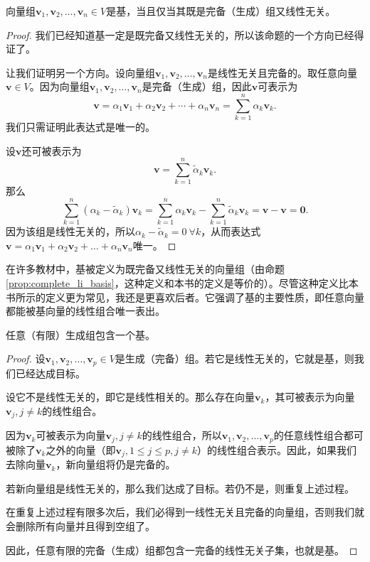 \begin{proposition}\label{prop:complete_li_basis}
    向量组$\mathbf{v}_{1},\mathbf{v}_{2},\ldots,\mathbf{v}_{n}\in V$是基，当且仅当其既是完备（生成）组又线性无关。
\end{proposition}

\begin{proof}
    我们已经知道基一定是既完备又线性无关的，所以该命题的一个方向已经得证了。

    让我们证明另一个方向。设向量组$\mathbf{v}_{1},\mathbf{v}_{2},\ldots,\mathbf{v}_{n}$是线性无关且完备的。取任意向量$\mathbf{v}\in V$。因为向量组$\mathbf{v}_{1},\mathbf{v}_{2},\ldots,\mathbf{v}_{n}$是完备（生成）组，因此$\mathbf{v}$可表示为\[\mathbf{v}=\alpha_1\mathbf{v}_1+\alpha_2\mathbf{v}_2+\cdots+\alpha_n\mathbf{v}_n=\sum_{k=1}^n\alpha_k\mathbf{v}_k.\]
    我们只需证明此表达式是唯一的。

    设$\mathbf{v}$还可被表示为\[\mathbf{v}=\sum_{k=1}^{n}\widetilde{\alpha}_{k}\mathbf{v}_{k}.\]
    那么\[\sum_{k=1}^n(\alpha_k-\widetilde{\alpha}_k)\mathbf{v}_k=\sum_{k=1}^n\alpha_k\mathbf{v}_k-\sum_{k=1}^n\widetilde{\alpha}_k\mathbf{v}_k=\mathbf{v}-\mathbf{v}=\mathbf{0}.\]
    因为该组是线性无关的，所以$\alpha_k-\widetilde{\alpha}_k = 0\ \forall k$，从而表达式$\mathbf{v}=\alpha_{1}\mathbf{v}_{1}+\alpha_{2}\mathbf{v}_{2}+\ldots+\alpha_{n}\mathbf{v}_{n}$唯一。
\end{proof}

\begin{remark*}
    在许多教材中，基被定义为既完备又线性无关的向量组（由命题 \ref{prop:complete_li_basis}，这种定义和本书的定义是等价的）。尽管这种定义比本书所示的定义更为常见，我还是更喜欢后者。它强调了基的主要性质，即任意向量都能被基向量的线性组合唯一表出。
\end{remark*}

\begin{proposition}\label{prop:generating_contain_basis}
    任意（有限）生成组包含一个基。
\end{proposition}

\begin{proof}
    设$\mathbf{v}_{1},\mathbf{v}_{2},\ldots,\mathbf{v}_{p}\in V$是生成（完备）组。若它是线性无关的，它就是基，则我们已经达成目标。

    设它不是线性无关的，即它是线性相关的。那么存在向量$\mathbf{v}_k$，其可被表示为向量$\mathbf{v}_j,j\ne k$的线性组合。

    因为$\mathbf{v}_k$可被表示为向量$\mathbf{v}_j,j\ne k$的线性组合，所以$\mathbf{v}_{1},\mathbf{v}_{2},\ldots,\mathbf{v}_{p}$的任意线性组合都可被除了$\mathbf{v}_{k}$之外的向量（即$\mathbf{v}_j,1\le j\le p, j\ne k$）的线性组合表示。因此，如果我们去除向量$\mathbf{v}_k$，新向量组将仍是完备的。

    若新向量组是线性无关的，那么我们达成了目标。若仍不是，则重复上述过程。

    在重复上述过程有限多次后，我们必得到一线性无关且完备的向量组，否则我们就会删除所有向量并且得到空组了。

    因此，任意有限的完备（生成）组都包含一完备的线性无关子集，也就是基。
\end{proof}

